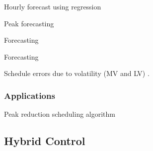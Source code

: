 Hourly forecast using regression \cite{Papalexopoulos1990}

Peak forecasting \cite{Barakat1990}

Forecasting \cite{Charlton2014}

Forecasting \cite{Taieb2013}

Schedule errors due to volatility (MV and LV) \cite{Haben2014}.

\subsubsection{Applications}

Peak reduction scheduling algorithm \cite{Rowe2014a}

\subsection{Hybrid Control}

%

